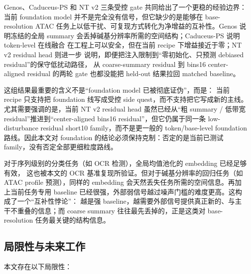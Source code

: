 \documentclass[11pt,a4paper]{ctexart}
\begin{document}
Genos、Caduceus-PS 和 NT v2 三条受控 gate 共同给出了一个更稳的经验边界：
当前 foundation model 并不是完全没有信号，但它缺少的是能够在 base-resolution
ATAC 任务上以低干扰、可复现方式转化为净增益的互补性。Genos 说明冻结的全局
summary 会丢掉碱基分辨率所需的空间结构；Caduceus-PS 说明 token-level 在线融合
在工程上可以安全，但在当前 recipe 下增益接近于零；NT v2 residual head 则进一步
说明，即便把注入限制到“零初始化、只预测 debiased residual”的保守低扰动路径，
从 coarse-summary residual 到 bins16 center-aligned residual 的两轮 gate 也都没能把
held-out 结果拉回 matched baseline。

这组结果最重要的含义不是“foundation model 已被彻底证伪”，而是：
当前 recipe 只支持把 foundation 线写成受控 side quest，而不支持把它写成新的主线。
尤其需要强调的是，当前 NT v2 residual head 虽然已经从“粗 summary /
低带宽 residual”推进到“center-aligned bins16 residual”，但它仍属于同一条
low-disturbance residual short10 family，而不是更一般的 token/base-level
foundation 路线。因此本文对 foundation 的结论必须保持克制：否定的是当前已测试
family，没有否定全部更细粒度路线。

对于序列级别的分类任务（如 OCR 检测），全局均值池化的 embedding 已经足够有效，
这也被本文的 OCR 基准复现所验证。但对于碱基分辨率的回归任务（如 ATAC profile
预测），同样的 embedding 会天然丢失任务所需的空间信息。再加上当前任务专用
baseline 已经很强，外部弱信号越过噪声门槛的难度更高。这构成了一个“互补性悖论”：
越是强 baseline，越需要外部信号提供真正新的、与主干不重叠的信息；而 coarse
summary 往往最先丢掉的，正是这类对 base-resolution 任务最关键的结构信息。

\subsection{局限性与未来工作}

本文存在以下局限性：
\end{document}
